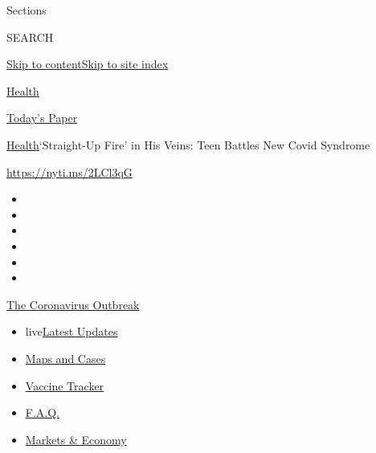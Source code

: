 Sections

SEARCH

\protect\hyperlink{site-content}{Skip to
content}\protect\hyperlink{site-index}{Skip to site index}

\href{https://www.nytimes.com/section/health}{Health}

\href{https://myaccount.nytimes.com/auth/login?response_type=cookie\&client_id=vi}{}

\href{https://www.nytimes.com/section/todayspaper}{Today's Paper}

\href{/section/health}{Health}\textbar{}`Straight-Up Fire' in His Veins:
Teen Battles New Covid Syndrome

\href{https://nyti.ms/2LCl3qG}{https://nyti.ms/2LCl3qG}

\begin{itemize}
\item
\item
\item
\item
\item
\item
\end{itemize}

\href{https://www.nytimes.com/news-event/coronavirus?action=click\&pgtype=Article\&state=default\&region=TOP_BANNER\&context=storylines_menu}{The
Coronavirus Outbreak}

\begin{itemize}
\tightlist
\item
  live\href{https://www.nytimes.com/2020/08/08/world/coronavirus-updates.html?action=click\&pgtype=Article\&state=default\&region=TOP_BANNER\&context=storylines_menu}{Latest
  Updates}
\item
  \href{https://www.nytimes.com/interactive/2020/us/coronavirus-us-cases.html?action=click\&pgtype=Article\&state=default\&region=TOP_BANNER\&context=storylines_menu}{Maps
  and Cases}
\item
  \href{https://www.nytimes.com/interactive/2020/science/coronavirus-vaccine-tracker.html?action=click\&pgtype=Article\&state=default\&region=TOP_BANNER\&context=storylines_menu}{Vaccine
  Tracker}
\item
  \href{https://www.nytimes.com/interactive/2020/world/coronavirus-tips-advice.html?action=click\&pgtype=Article\&state=default\&region=TOP_BANNER\&context=storylines_menu}{F.A.Q.}
\item
  \href{https://www.nytimes.com/live/2020/08/07/business/stock-market-today-coronavirus?action=click\&pgtype=Article\&state=default\&region=TOP_BANNER\&context=storylines_menu}{Markets
  \& Economy}
\end{itemize}

